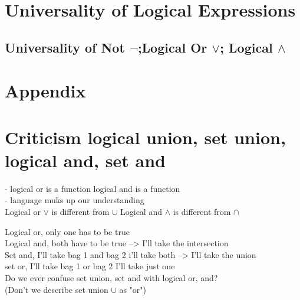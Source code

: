 \documentclass[11pt]{article}
\begin{document}
\section{Universality of Logical Expressions}
\subsection{Universality of Not $\lnot$;\hspace{2mm}Logical Or $\lor$;\hspace{2mm} Logical $\land$}







\newpage
\section*{Appendix}
\section{Criticism logical union, set union, logical and, set and}
- logical or is a function logical and is a function\\
- language muks up our understanding\\

Logical or $\lor$ is different from $\cup$
Logical and $\land$ is different from $\cap$

Logical or, only one has to be true\\
Logical and, both have to be true --> I'll take the intersection\\

Set and, I'll take bag 1 and bag 2 i'll take both --> I'll take the union\\
set or, I'll take bag 1 or bag 2 I'll take just one\\

Do we ever confuse set union, set and with logical or, and?\\
(Don't we describe set union $\cup$ as "or")
\end{document}
